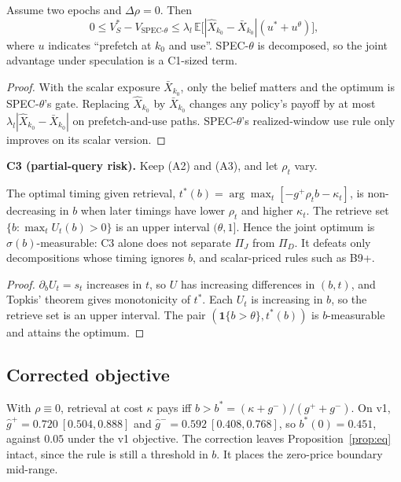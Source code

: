 \begin{proposition}\label{prop:spectheta}
Assume two epochs and $\Delta\rho=0$. Then
\[
0\le V^{*}_S-V_{\mathrm{SPEC}\text{-}\theta}
\le\lambda_l\,\mathbb E\big[|\hat X_{k_0}-\bar X_{k_0}|(u^{*}+u^{\theta})\big],
\]
where $u$ indicates ``prefetch at $k_0$ and use''. SPEC-$\theta$ is decomposed,
so the joint advantage under speculation is a C1-sized term.
\end{proposition}
\begin{proof}
With the scalar exposure $\bar X_{k_0}$, only the belief matters and the
optimum is SPEC-$\theta$'s gate. Replacing $\hat X_{k_0}$ by $\bar X_{k_0}$
changes any policy's payoff by at most $\lambda_l|\hat X_{k_0}-\bar X_{k_0}|$
on prefetch-and-use paths. SPEC-$\theta$'s realized-window use rule only
improves on its scalar version.
\end{proof}

\textbf{C3 (partial-query risk).} Keep (A2) and (A3), and let $\rho_t$ vary.

\begin{proposition}[C3]\label{prop:c3}
The optimal timing given retrieval, $t^{*}(b)=\arg\max_t[-g^{+}\rho_tb-\kappa_t]$,
is non-decreasing in $b$ when later timings have lower $\rho_t$ and higher
$\kappa_t$. The retrieve set $\{b:\max_tU_t(b)>0\}$ is an upper interval
$(\theta,1]$. Hence the joint optimum is $\sigma(b)$-measurable: C3 alone does
not separate $\Pi_J$ from $\Pi_D$. It defeats only decompositions whose timing
ignores $b$, and scalar-priced rules such as B9+.
\end{proposition}
\begin{proof}
$\partial_bU_t=s_t$ increases in $t$, so $U$ has increasing differences in
$(b,t)$, and Topkis' theorem gives monotonicity of $t^{*}$. Each $U_t$ is
increasing in $b$, so the retrieve set is an upper interval. The pair
$(\mathbf 1\{b>\theta\},t^{*}(b))$ is $b$-measurable and attains the optimum.
\end{proof}

\subsection{Corrected objective}
With $\rho\equiv0$, retrieval at cost $\kappa$ pays iff
$b>b^{*}=(\kappa+g^{-})/(g^{+}+g^{-})$. On v1,
$\hat g^{+}=0.720\ [0.504,0.888]$ and $\hat g^{-}=0.592\ [0.408,0.768]$, so
$b^{*}(0)=0.451$, against $0.05$ under the v1 objective. The correction leaves
Proposition~\ref{prop:eq} intact, since the rule is still a threshold in $b$.
It places the zero-price boundary mid-range.

